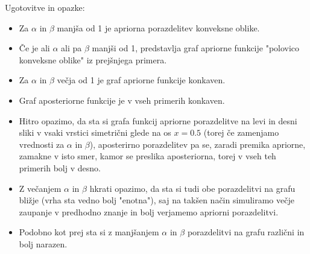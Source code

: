\documentclass[a4paper,11pt]{article}
\begin{document}
\newpage
Ugotovitve in opazke:
\begin{itemize}
    \item Za $\alpha$ in $\beta$ manjša od 1 je apriorna porazdelitev konveksne oblike.
    \item Če je ali $\alpha$ ali pa $\beta$ manjši od 1, predstavlja graf apriorne funkcije "polovico konveksne oblike" iz prejšnjega primera.
    \item Za $\alpha$ in $\beta$ večja od 1 je graf apriorne funkcije konkaven. 
    \item Graf aposteriorne funkcije je v vseh primerih konkaven.
    \item Hitro opazimo, da sta si grafa funkcij apriorne porazdelitve na levi in desni sliki v vsaki vrstici simetrični glede na os $x = 0.5$ (torej če zamenjamo vrednosti za $\alpha$ in $\beta$), 
aposterirno porazdelitev pa se, zaradi premika apriorne, zamakne v isto smer, kamor se preslika aposteriorna, torej v vseh teh primerih bolj v desno.
    \item Z večanjem $\alpha$ in $\beta$ hkrati opazimo, da sta si tudi obe porazdelitvi na grafu bližje (vrha sta vedno bolj "enotna"), saj na takšen način simuliramo večje zaupanje v predhodno znanje in bolj verjamemo apriorni porazdelitvi. 
    \item Podobno kot prej sta si z manjšanjem $\alpha$ in $\beta$ porazdelitvi na grafu različni in bolj narazen.
\end{itemize}
\end{document}
